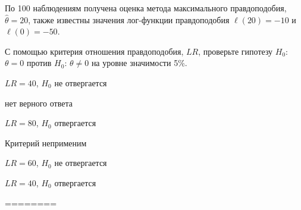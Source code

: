 
\begin{question}
По 100 наблюдениям получена оценка метода максимального правдоподобия,
\(\hat\theta = 20\), также известны значения лог-функции правдоподобия
\(\ell(20) = -10\) и \(\ell(0)= - 50\).

С помощью критерия отношения правдоподобия, \(LR\), проверьте гипотезу
\(H_0\): \(\theta = 0\) против \(H_0\): \(\theta \neq 0\) на уровне
значимости 5\%.
\begin{answerlist}
  \item \(LR = 40\), \(H_0\) не отвергается
  \item нет верного ответа
  \item \(LR = 80\), \(H_0\) отвергается
  \item Критерий неприменим
  \item \(LR = 60\), \(H_0\) не отвергается
  \item \(LR = 40\), \(H_0\) отвергается
\end{answerlist}
\end{question}

\begin{solution}
========
\end{solution}

